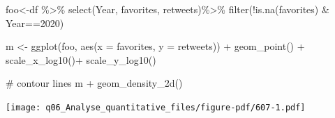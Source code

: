 \documentclass[
  letterpaper,
  DIV=11,
  numbers=noendperiod]{scrreprt}
\newenvironment{Shaded}{\begin{snugshade}}{\end{snugshade}}
\newcommand{\AttributeTok}[1]{\textcolor[rgb]{0.40,0.45,0.13}{#1}}
\newcommand{\CommentTok}[1]{\textcolor[rgb]{0.37,0.37,0.37}{#1}}
\newcommand{\DecValTok}[1]{\textcolor[rgb]{0.68,0.00,0.00}{#1}}
\newcommand{\FunctionTok}[1]{\textcolor[rgb]{0.28,0.35,0.67}{#1}}
\newcommand{\NormalTok}[1]{\textcolor[rgb]{0.00,0.23,0.31}{#1}}
\newcommand{\OtherTok}[1]{\textcolor[rgb]{0.00,0.23,0.31}{#1}}
\newcommand{\SpecialCharTok}[1]{\textcolor[rgb]{0.37,0.37,0.37}{#1}}
\begin{document}
\begin{Shaded}
\begin{Highlighting}[]
\NormalTok{foo}\OtherTok{\textless{}{-}}\NormalTok{df }\SpecialCharTok{\%\textgreater{}\%} \FunctionTok{select}\NormalTok{(Year, favorites, retweets)}\SpecialCharTok{\%\textgreater{}\%}
  \FunctionTok{filter}\NormalTok{(}\SpecialCharTok{!}\FunctionTok{is.na}\NormalTok{(favorites) }\SpecialCharTok{\&}\NormalTok{ Year}\SpecialCharTok{==}\DecValTok{2020}\NormalTok{)}


\NormalTok{m }\OtherTok{\textless{}{-}} \FunctionTok{ggplot}\NormalTok{(foo, }\FunctionTok{aes}\NormalTok{(}\AttributeTok{x =}\NormalTok{ favorites, }\AttributeTok{y =}\NormalTok{ retweets)) }\SpecialCharTok{+}
 \FunctionTok{geom\_point}\NormalTok{() }\SpecialCharTok{+}
\FunctionTok{scale\_x\_log10}\NormalTok{()}\SpecialCharTok{+}
\FunctionTok{scale\_y\_log10}\NormalTok{()}

\CommentTok{\# contour lines}
\NormalTok{m }\SpecialCharTok{+} \FunctionTok{geom\_density\_2d}\NormalTok{()}
\end{Highlighting}
\end{Shaded}

\texttt{[image: q06\_Analyse\_quantitative\_files/figure-pdf/607-1.pdf]}
\end{document}
